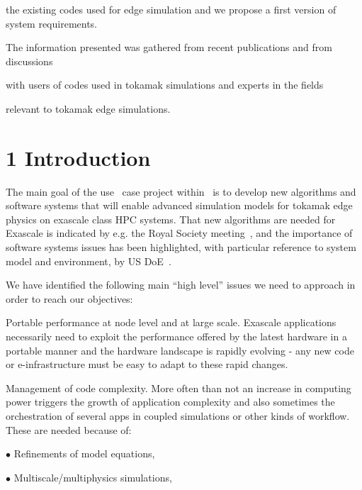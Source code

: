 \documentclass{article}
\begin{document}
the existing codes used for edge simulation and we propose a first version of system 
requirements. 

The information presented was gathered from recent publications and from discussions 

with users of codes used in tokamak simulations and experts in the fields 

relevant to tokamak edge simulations. \pagebreak{}


\section*{{\Large{}{ \textbf{1 Introduction}}}}

\baselineskip=18pt
The main goal of the use \nep \   case project within \exc \   is to develop new 
algorithms and software systems that will enable advanced simulation models for 
tokamak edge physics on exascale class HPC systems. That new algorithms are needed 
for Exascale is indicated by e.g. the Royal Society meeting~\cite{sciplan}, and the importance 
of software systems issues has been highlighted, with particular reference to system 
model and environment, by US DoE~\cite{pappeqs}.

We have identified the following main ``high level'' issues we need to approach 
in order to reach our objectives:

\begin{enumerate}
\end{enumerate}
\begin{itemize}
\end{itemize}
\item Portable performance at node level and at large scale. Exascale applications 
necessarily need to exploit the performance offered by the latest hardware in a 
portable manner and the hardware landscape is rapidly evolving - any new code or 
e-infrastructure must be easy to adapt to these rapid changes.

\item Management of code complexity. More often than not an increase in computing 
power triggers the growth of application complexity and also sometimes the orchestration 
of several apps in coupled simulations or other kinds of workflow. These are needed 
because of:

\item[$\bullet$] Refinements of model equations,

\item[$\bullet$] Multiscale/multiphysics simulations,
\end{document}
